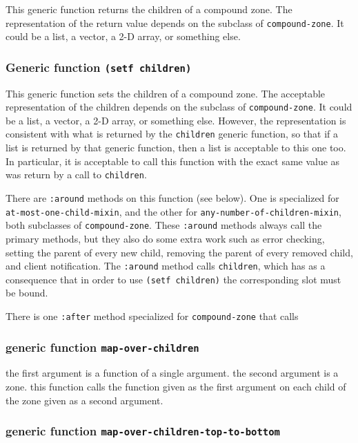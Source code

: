 \documentclass{report}
\begin{document}
This generic function returns the children of a compound zone.  The
representation of the return value depends on the subclass of
\texttt{compound-zone}.  It could be a list, a vector, a 2-D array, or
something else.

\subsubsection{Generic function \texttt{(setf children)}}

This generic function sets the children of a compound zone.  The
acceptable representation of the children depends on the subclass of
\texttt{compound-zone}.  It could be a list, a vector, a 2-D array, or
something else.  However, the representation is consistent with what
is returned by the \texttt{children} generic function, so that if a list is
returned by that generic function, then a list is acceptable to this
one too.  In particular, it is acceptable to call this function with
the exact same value as was return by a call to \texttt{children}.

There are \texttt{:around} methods on this function (see below).  One
is specialized for \texttt{at-most-one-child-mixin}, and the other for
\texttt{any-number-of-children-mixin}, both subclasses of
\texttt{compound-zone}.  These \texttt{:around} methods always call
the primary methods, but they also do some extra work such as error
checking, setting the parent of every new child, removing the parent
of every removed child, and client notification.  The \texttt{:around}
method calls \texttt{children}, which has as a consequence that in
order to use \texttt{(setf children)} the corresponding slot must be
bound.

There is one \texttt{:after} method specialized for
\texttt{compound-zone} that calls

\subsubsection{generic function \texttt{map-over-children}}

the first argument is a function of a single argument.  the second
argument is a zone.  this function calls the function given as the
first argument on each child of the zone given as a second argument.  

\subsubsection{generic function \texttt{map-over-children-top-to-bottom}}
\end{document}
